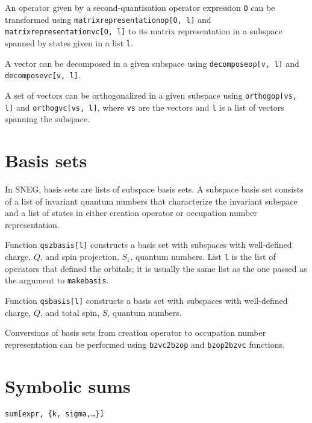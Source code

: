 \documentclass[a4paper,10pt,openany]{book}
\begin{document}
An operator given by a second-quantisation operator expression {\tt O} can
be transformed using {\tt matrixrepresentationop[O, l]} and {\tt
matrixrepresentationvc[O, l]} to its matrix representation in a subspace
spanned by states given in a list {\tt l}.

A vector can be decomposed in a given subspace using {\tt decomposeop[v, l]}
and {\tt decomposevc[v, l]}.

A set of vectors can be orthogonalized in a given subspace using
{\tt orthogop[vs, l]} and {\tt orthogvc[vs, l]}, where {\tt vs} are
the vectors and {\tt l} is a list of vectors spanning the subspace.


\section{Basis sets}

In SNEG, basis sets are lists of subspace basis sets. A subspace basis
set consists of a list of invariant quantum numbers that characterize
the invariant subspace and a list of states in either creation operator
or occupation number representation.

Function {\tt qszbasis[l]} constructs a basis set with subspaces with
well-defined charge, $Q$, and spin projection, $S_z$, quantum numbers. List
{\tt l} is the list of operators that defined the orbitals; it is usually
the same list as the one passed as the argument to {\tt makebasis}.

Function {\tt qsbasis[l]} constructs a basis set with subspaces with
well-defined charge, $Q$, and total spin, $S$, quantum numbers.

Conversions of basis sets from creation operator to occupation
number representation can be performed using {\tt bzvc2bzop} 
and {\tt bzop2bzvc} functions.


\section{Symbolic sums}

{\tt sum[expr, \{k, sigma,{\ldots}\}]}
\end{document}
